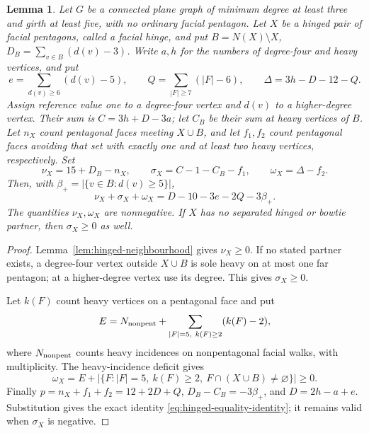 \documentclass[11pt]{article}
\newtheorem{lemma}[theorem]{Lemma}
\theoremstyle{remark}
\numberwithin{equation}{section}
\numberwithin{table}{section}
\begin{document}
\begin{lemma}\label{lem:hinged-equality-identity}
Let $G$ be a connected plane graph of minimum degree at least three
and girth at least five, with no ordinary facial pentagon. Let $X$
be a hinged pair of facial pentagons, called a facial hinge, and put
$B=N(X)\setminus X$, $D_B=\sum_{v\in B}(d(v)-3)$. Write $a,h$ for
the numbers of degree-four and heavy vertices, and put
\[
 e=\sum_{d(v)\ge6}(d(v)-5),\qquad
 Q=\sum_{|F|\ge7}(|F|-6),\qquad
 \Delta=3h-D-12-Q.
\]
Assign reference value one to a degree-four vertex and $d(v)$ to
a higher-degree vertex. Their sum is $C=3h+D-3a$; let $C_B$ be
their sum at heavy vertices of $B$. Let $n_X$ count pentagonal faces
meeting $X\cup B$, and let $f_1,f_2$ count pentagonal faces avoiding that set
with exactly one and at least two heavy vertices, respectively. Set
\[
 \nu_X=15+D_B-n_X,\qquad
 \sigma_X=C-1-C_B-f_1,\qquad
 \omega_X=\Delta-f_2.
\]
Then, with $\beta_+=|\{v\in B:d(v)\ge5\}|$,
\begin{equation}\label{eq:hinged-equality-identity}
 \nu_X+\sigma_X+\omega_X=D-10-3e-2Q-3\beta_+.
\end{equation}
The quantities $\nu_X,\omega_X$ are nonnegative. If $X$ has no
separated hinged or bowtie partner, then $\sigma_X\ge0$ as well.
\end{lemma}
\begin{proof}
Lemma~\ref{lem:hinged-neighbourhood} gives $\nu_X\ge0$. If no
stated partner exists, a degree-four vertex outside $X\cup B$ is
sole heavy on at most one far pentagon; at a higher-degree vertex
use its degree. This gives $\sigma_X\ge0$.

Let $k(F)$ count heavy vertices on a pentagonal face and put
\[
 E=N_{\rm nonpent}+\sum_{|F|=5,\ k(F)\ge2}(k(F)-2),
\]
where $N_{\rm nonpent}$ counts heavy incidences on nonpentagonal
facial walks, with multiplicity. The heavy-incidence deficit gives
\begin{equation}\label{eq:hinged-multiheavy-loss}
 \omega_X=E+
 |\{F:|F|=5,\ k(F)\ge2,\ F\cap(X\cup B)\ne\varnothing\}|\ge0.
\end{equation}
Finally $p=n_X+f_1+f_2=12+2D+Q$,
$D_B-C_B=-3\beta_+$, and $D=2h-a+e$. Substitution gives the exact
identity \eqref{eq:hinged-equality-identity}; it remains valid when
$\sigma_X$ is negative.
\end{proof}
\end{document}
